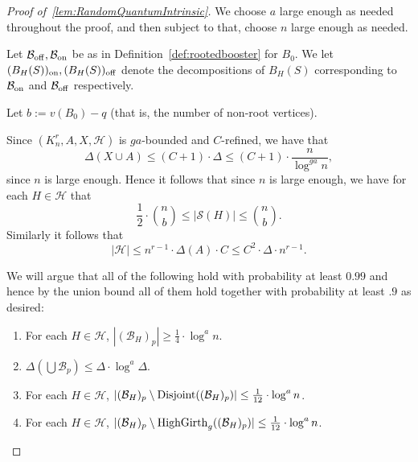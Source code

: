\documentclass[11pt]{article}
\newcommand{\mc}[1]{\mathcal{#1}}
\newcounter{i}
\theoremstyle{plain}
\renewcommand{\theclaim}{\thetheorem.\arabic{claim}}
\newenvironment{lateproof}[1]
 {%
  \renewcommand{\theclaim}{\ref{#1}.\arabic{claim}}%
  \begin{proof}[Proof of~\cref{#1}]%
 }
 {\end{proof}}
\theoremstyle{plain} %
\theoremstyle{definition}
\begin{document}
\begin{lateproof}{lem:RandomQuantumIntrinsic}
We choose $a$ large enough as needed throughout the proof, and then subject to that, choose $n$ large enough as needed.

Let $\mathcal{B}_{{\rm off}}, \mathcal{B}_{{\rm on}}$ be as in Definition~\ref{def:rootedbooster} for $B_0$. We let $(B_H(S))_{\rm on}, (B_H(S))_{\rm off}$ denote the decompositions of $B_H(S)$ corresponding to $\mathcal{B}_{\rm on}$ and $\mathcal{B}_{\rm off}$ respectively. 

Let $b:= v(B_0)-q$ (that is, the number of non-root vertices). 

Since $(K_n^r,A,X,\mc{H})$ is $ga$-bounded and $C$-refined, we have that $$\Delta(X\cup A)\le (C+1)\cdot \Delta \le (C+1)\cdot \frac{n}{\log^{ga} n},$$
since $n$ is large enough. Hence it follows that since $n$ is large enough, we have for each $H\in \mc{H}$ that
$$\frac{1}{2}\cdot \binom{n}{b} \le |\mathcal{S}(H)| \le \binom{n}{b}.$$ Similarly it follows that $$|\mathcal{H}| \le n^{r-1}\cdot \Delta(A) \cdot C \le C^2\cdot \Delta \cdot n^{r-1}.$$

We will argue that all of the following hold with probability at least $0.99$ and hence by the union bound all of them hold together with probability at least $.9$ as desired:

\begin{enumerate}
    \item[(1)] For each $H\in \mathcal{H}$, $|(\mathcal{B}_{H})_p| \ge \frac{1}{4}\cdot \log^{a} n$. 
    \item[(2)] $\Delta(\bigcup \mc{B}_p)\le \Delta\cdot \log^{a} \Delta$. 
    \item[(3)] For each $H\in \mathcal{H}$, $|(\mathcal{B}_{H})_p\setminus {\rm Disjoint}((\mathcal{B}_{H})_p)| \le \frac{1}{12} \cdot \log^{a} n$.
    \item[(4)] For each $H\in \mathcal{H}$, $|(\mathcal{B}_{H})_p\setminus {\rm HighGirth}_g((\mathcal{B}_{H})_p)| \le \frac{1}{12} \cdot \log^{a} n$.
\end{enumerate}


\end{lateproof}
\end{document}
